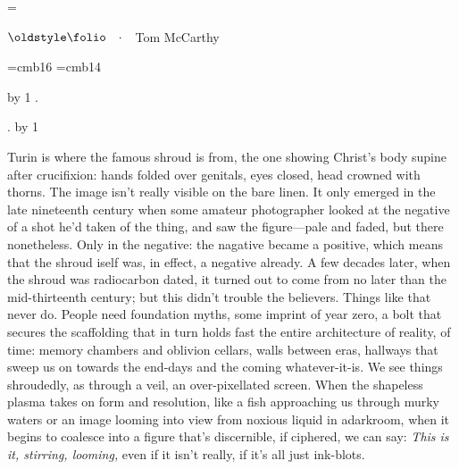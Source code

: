 \nopagenumbers
\headline={\centerline{$\oldstyle \folio \quad\cdotp\quad$Tom McCarthy}}
\def\paperwidth{144mm}
\def\paperheight{210mm}
\def\hmargin{20mm}
\def\tmargin{20mm}
\def\bmargin{20mm}
\special{papersize=\paperwidth, \paperheight}
\hsize=\paperwidth
\vsize=\paperheight
\hoffset=-1in
\voffset=-1in
\advance\hsize -\hmargin\relax
\advance\hsize -\hmargin\relax
\advance\vsize -\tmargin\relax
\advance\vsize -\bmargin\relax
\advance\hoffset \hmargin\relax
\advance\voffset \tmargin\relax

\newcount\chaptercount
\newcount\sectioncount
\font\chapterfont=cmb16
\def\chapter{
  \vfill\eject%
  \vglue 12mm
  \advance\chaptercount by 1
  \hfil {\chapterfont\the\chaptercount.} \hfil\par
  \sectioncount1\relax
}
\font\sectionfont=cmb14
\def\section{
  \vskip 12mm
  \parindent=0pt
  {\sectionfont\the\chaptercount.\the\sectioncount}
  \advance\sectioncount by 1
}

\chapter
\section
Turin is where the famous shroud is from, the one showing Christ's body supine after crucifixion: hands folded over genitals, eyes closed, head crowned with thorns.
The image isn't really visible on the bare linen.
It only emerged in the late nineteenth century when some amateur photographer looked at the negative of a shot he'd taken of the thing, and saw the figure---pale and faded, but there nonetheless.
Only in the negative: the nagative became a positive, which means that the shroud iself was, in effect, a negative already.
A few decades later, when the shroud was radiocarbon dated, it turned out to come from no later than the mid-thirteenth century; but this didn't trouble the believers.
Things like that never do.
People need foundation myths, some imprint of year zero, a bolt that secures the scaffolding that in turn holds fast the entire architecture of reality, of time: memory chambers and oblivion cellars, walls between eras, hallways that sweep us on towards the end-days and the coming whatever-it-is.
We see things shroudedly, as through a veil, an over-pixellated screen.
When the shapeless plasma takes on form and resolution, like a fish approaching us through murky waters or an image looming into view from noxious liquid in adarkroom, when it begins to coalesce into a figure that's discernible, if ciphered, we can say: {\it This is it, stirring, looming,} even if it isn't really, if it's all just ink-blots.

